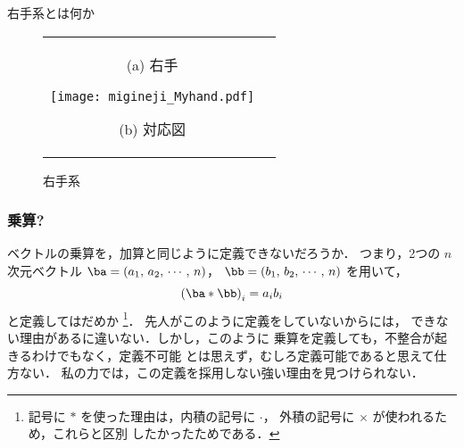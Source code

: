 \begin{memo}{右手系とは何か}
\begin{figure}[hbt]
\begin{tabular}{cc}
\begin{minipage}{0.5\hsize}
\begin{center}
                                    (a) 右手
                                    \label{fig:migitekei_TE_mono_x}
                                \end{center}
                            \end{minipage}
                            \begin{minipage}{0.5\hsize}
                                \begin{center}
                                    \texttt{[image: migineji\_Myhand.pdf]}

                                    (b) 対応図
                                    \label{fig:migineji_Myhand}
                                \end{center}
                            \end{minipage}
                        \end{tabular}
                        \caption{右手系}
                    \end{figure}
                \end{memo}

        \subsubsection{乗算?}
            ベクトルの乗算を，加算と同じように定義できないだろうか．
            つまり，2つの $n$ 次元ベクトル $\ba=(a_{1},\,a_{2},\,\cdots,\,n)$，
            $\bb=(b_{1},\,b_{2},\,\cdots,\,n)$ を用いて，
                \begin{equation*}
                    {(\ba \ast \bb)}_{i} = a_{i}b_{i}
                \end{equation*}
            と定義してはだめか
                \footnote{
                    記号に $\ast$ を使った理由は，内積の記号に $\cdot$，
                    外積の記号に $\times$ が使われるため，これらと区別
                    したかったためである．
                }．
            先人がこのように定義をしていないからには，
            できない理由があるに違いない．しかし，このように
            乗算を定義しても，不整合が起きるわけでもなく，定義不可能
            とは思えず，むしろ定義可能であると思えて仕方ない．
            私の力では，この定義を採用しない強い理由を見つけられない．

